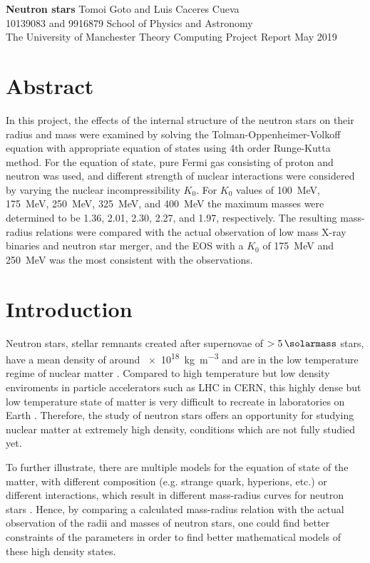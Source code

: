 \documentclass[draft,11pt]{article}
\theoremstyle{definition}
\theoremstyle{remark}
\newcommand{\makecover}[5]{
\thispagestyle{empty}
\setcounter{page}{0}
\begin{center}\LARGE{\bf #1}\vskip 24pt \normalsize{#2}\hspace*{\fill}\\
#3\vskip 12pt School of Physics and Astronomy\\The University of Manchester\vskip 12pt Theory Computing Project Report\vskip 12pt #4\end{center}\vskip 54pt

\section*{Abstract}
#5
\newpage}
\begin{document}
    \makecover
    {Neutron stars}
    {Tomoi Goto and Luis Caceres Cueva}
    {10139083 and 9916879}
    {May 2019}
    {In this project, the effects of the internal structure of the neutron stars on their radius and mass were examined by solving the Tolman-Oppenheimer-Volkoff equation with appropriate equation of states using 4th order Runge-Kutta method. For the equation of state, pure Fermi gas consisting of proton and neutron was used, and different strength of nuclear interactions were considered by varying the nuclear incompressibility $K_0$. For $K_{0}$ values of \SI{100}{\mega\electronvolt}, \SI{175}{\mega\electronvolt}, \SI{250}{\mega\electronvolt}, \SI{325}{\mega\electronvolt}, and \SI{400}{\mega\electronvolt} the maximum masses were determined to be \SI{1.36}{\solarmass}, \SI{2.01}{\solarmass}, \SI{2.30}{\solarmass}, \SI{2.27}{\solarmass}, and \SI{1.97}{\solarmass}, respectively. The resulting mass-radius relations were compared with the actual observation of low mass X-ray binaries and neutron star merger, and the EOS with a $K_0$ of \SI{175}{\mega\electronvolt} and \SI{250}{\mega\electronvolt} was the most consistent with the observations.}
    
    \section{Introduction}
        Neutron stars, stellar remnants created after supernovae of $>\SI{5}{\solarmass}$ stars, have a mean density of around \SI{e18}{\kilogram\per\meter\cubed} and are in the low temperature regime of nuclear matter \parencite{shapiro.teukolsky.1983/bh.wd.ns.co}. Compared to high temperature but low density enviroments in particle accelerators such as LHC in CERN, this highly dense but low temperature state of matter is very difficult to recreate in laboratories on Earth \parencite{graber.andersson.2017/ns.lab}. Therefore, the study of neutron stars offers an opportunity for studying nuclear matter at extremely high density, conditions which are not fully studied yet.  
        
        To further illustrate, there are multiple models for the equation of state of the matter, with different composition (e.g. strange quark, hyperions, etc.) or different interactions, which result in different mass-radius curves for neutron stars \cite{graber.andersson.2017/ns.lab}. Hence, by comparing a calculated mass-radius relation with the actual observation of the radii and masses of neutron stars, one could find better constraints of the parameters in order to find better mathematical models of these high density states.
        
\end{document}

